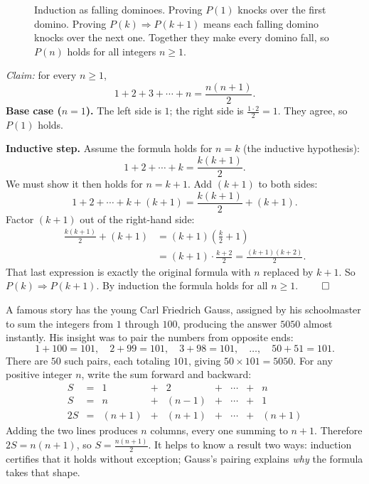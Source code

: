 \begin{figure}[htbp]
\caption{Induction as falling dominoes. Proving $P(1)$ knocks over the first
domino. Proving $P(k) \Rightarrow P(k+1)$ means each falling domino knocks over
the next one. Together they make every domino fall, so $P(n)$ holds for all
integers $n \ge 1$.}
\label{ch40:fig-domino}
\end{figure}

\begin{example}
\label{ch40:ex-induction}
\emph{Claim:} for every $n \ge 1$,
\[
  1 + 2 + 3 + \cdots + n = \frac{n(n+1)}{2}.
\]
\textbf{Base case ($n=1$).} The left side is $1$; the right side is
$\tfrac{1\cdot 2}{2}=1$. They agree, so $P(1)$ holds.

\textbf{Inductive step.} Assume the formula holds for $n=k$ (the inductive
hypothesis):
\[
  1 + 2 + \cdots + k = \frac{k(k+1)}{2}.
\]
We must show it then holds for $n=k+1$. Add $(k+1)$ to both sides:
\[
  1 + 2 + \cdots + k + (k+1) = \frac{k(k+1)}{2} + (k+1).
\]
Factor $(k+1)$ out of the right-hand side:
\begin{align*}
  \frac{k(k+1)}{2} + (k+1) &= (k+1)\left(\frac{k}{2} + 1\right) \\
  &= (k+1)\cdot\frac{k+2}{2} = \frac{(k+1)(k+2)}{2}.
\end{align*}
That last expression is exactly the original formula with $n$ replaced by $k+1$.
So $P(k)\Rightarrow P(k+1)$. By induction the formula holds for all $n \ge 1$.
$\qed$
\end{example}

\begin{whybox}
A famous story has the young Carl Friedrich Gauss, assigned by his schoolmaster to sum
the integers from $1$ through $100$, producing the answer $5050$ almost instantly.
His insight was to pair the numbers from opposite ends:
\[
  1 + 100 = 101, \quad 2 + 99 = 101, \quad 3 + 98 = 101, \quad \dots, \quad 50 + 51 = 101.
\]
There are $50$ such pairs, each totaling $101$, giving $50 \times 101 = 5050$. For any
positive integer $n$, write the sum forward and backward:
\[
  \begin{array}{rcccccccc}
    S  &=& 1     &+& 2       &+& \cdots &+& n \\
    S  &=& n     &+& (n-1)   &+& \cdots &+& 1 \\ \hline
    2S &=& (n+1) &+& (n+1)   &+& \cdots &+& (n+1)
  \end{array}
\]
Adding the two lines produces $n$ columns, every one summing to $n+1$. Therefore
$2S = n(n+1)$, so $S = \tfrac{n(n+1)}{2}$. It helps to know a result two ways:
induction certifies that it holds without exception; Gauss's pairing explains \emph{why}
the formula takes that shape.
\end{whybox}

